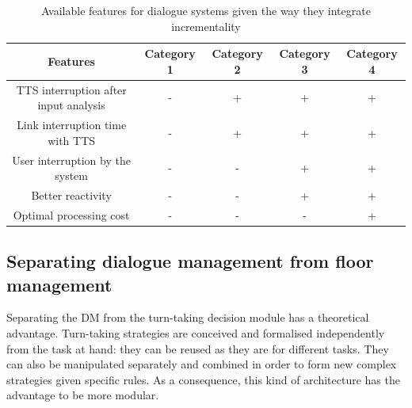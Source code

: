              \begin{table}[!ht]
      	     \footnotesize
             \centering
             \begin{tabular}{|c|c|c|c|c|}
               \hline
               \textbf{Features}	& \textbf{Category 1} & \textbf{Category 2} & \textbf{Category 3} & \textbf{Category 4} \\
               \hline
               TTS interruption after input analysis & - & + & + & + \\
               \hline
               Link interruption time with TTS & - & + & + & + \\
               \hline
               User interruption by the system & - & - & + & + \\
               \hline
               Better reactivity & - & - & + & + \\
               \hline
               Optimal processing cost & - & - & - & + \\
               \hline
             \end{tabular}
             \caption{Available features for dialogue systems given the way they integrate incrementality}
             \label{tab:incrclassif}
             \end{table}
    
       \subsection{Separating dialogue management from floor management}
            
            Separating the DM from the turn-taking decision module has a theoretical advantage. Turn-taking strategies are conceived and formalised independently from the task at hand: they can be reused as they are for different tasks. They can also be manipulated separately and combined in order to form new complex strategies given specific rules. As a consequence, this kind of architecture has the advantage to be more modular.
    
